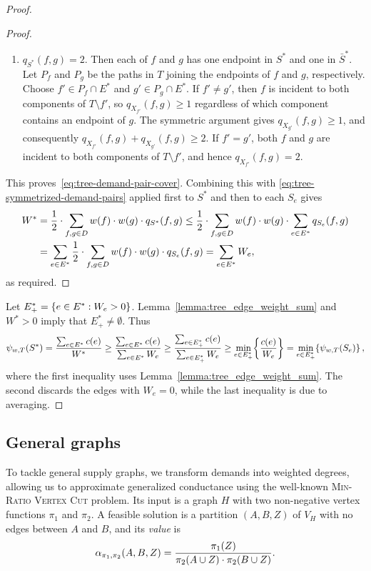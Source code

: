 \begin{proof}
\begin{proof}
\begin{enumerate}
      \item $q_{S^*}(f,g)=2$. Then each of $f$ and $g$ has one endpoint in $S^*$ and one in $\bar{S}^*$. Let $P_f$ and $P_g$ be the paths in $T$ joining the endpoints of $f$ and $g$, respectively. Choose $f'\in P_f\cap E^*$ and $g'\in P_g\cap E^*$.
    If $f'\neq g'$, then $f$ is incident to both components of $T\setminus f'$, so $q_{X_{f'}}(f,g)\geq1$ regardless of which component contains an endpoint of $g$. The symmetric argument gives $q_{X_{g'}}(f,g)\geq1$, and consequently $q_{X_{f'}}(f,g)+q_{X_{g'}}(f,g)\geq2$. If $f'=g'$, both $f$ and $g$ are incident to both components of $T\setminus f'$, and hence $q_{X_{f'}}(f,g)=2$.
    \end{enumerate}
    This proves~\eqref{eq:tree-demand-pair-cover}.
    Combining this with \eqref{eq:tree-symmetrized-demand-pairs} applied first to $S^*$ and then to each $S_e$ gives
    \begin{align*}
      W^* &= \frac{1}{2}\cdot \sum_{f,g\in D}w\mathopen{}\left( f \right)\cdot w\mathopen{}\left( g \right)\cdot q_{S^*}(f,g) \leq
      \frac{1}{2}\cdot \sum_{f,g\in D}w\mathopen{}\left( f \right)\cdot w\mathopen{}\left( g \right)\cdot \sum_{e\in E^*}q_{S_e}(f,g)
       \\&= \sum_{e\in E^*} \frac{1}{2}\cdot \sum_{f,g\in D}w\mathopen{}\left( f \right)\cdot w\mathopen{}\left( g \right)\cdot q_{S_e}(f,g)
       = \sum_{e\in E^*} W_e,
    \end{align*}
    as required.
  \end{proof}

  Let $E^*_+=\mathopen{}\left\{ e\in E^*:W_e>0 \right\}$. Lemma~\ref{lemma:tree_edge_weight_sum} and $W^*>0$ imply that $E^*_+\neq\emptyset$. Thus
  \[
    \psi_{w,T}\mathopen{}\left( S^* \right)
    =\frac{\sum_{e\in E^*}c\mathopen{}\left( e \right)}{W^*}
    \geq\frac{\sum_{e\in E^*}c\mathopen{}\left( e \right)}{\sum_{e\in E^*}W_e}
    \geq\frac{\sum_{e\in E^*_+}c\mathopen{}\left( e \right)}{\sum_{e\in E^*_+}W_e}
    \geq\min_{e\in E^*_+}\mathopen{}\left\{ \frac{c\mathopen{}\left( e \right)}{W_e} \right\}
    =\min_{e\in E^*_+}\mathopen{}\left\{ \psi_{w,T}\mathopen{}\left( S_e \right) \right\},
  \]
  where the first inequality uses Lemma~\ref{lemma:tree_edge_weight_sum}. The second discards the edges with $W_e=0$, while the last inequality is due to averaging.
\end{proof}

\subsection{General graphs}

To tackle general supply graphs, we transform demands into weighted degrees, allowing us to approximate generalized conductance using the well-known \textsc{Min-Ratio Vertex Cut} problem. Its input is a graph $H$ with two non-negative vertex functions $\pi_1$ and $\pi_2$. A feasible solution is a partition $(A,B,Z)$ of $V_H$ with no edges between $A$ and $B$, and its \emph{value} is
\[
  \alpha_{\pi_1,\pi_2}\mathopen{}\left( A,B,Z \right)
  =\frac{\pi_1\mathopen{}\left( Z \right)}
  {\pi_2\mathopen{}\left( A\cup Z \right)\cdot\pi_2\mathopen{}\left( B\cup Z \right)}.
\]


